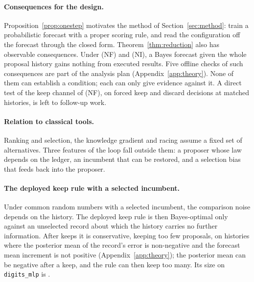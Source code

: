 \paragraph{Consequences for the design.}
Proposition~\ref{prop:onestep} motivates the method of Section~\ref{sec:method}: train a probabilistic forecast with a proper scoring rule, and read the configuration off the forecast through the closed form. Theorem~\ref{thm:reduction} also has observable consequences. Under (NF) and (NI), a Bayes forecast given the whole proposal history gains nothing from executed results. Five offline checks of such consequences are part of the analysis plan (Appendix~\ref{app:theory}). None of them can establish a condition; each can only give evidence against it. A direct test of the keep channel of (NF), on forced keep and discard decisions at matched histories, is left to follow-up work.

\paragraph{Relation to classical tools.}
Ranking and selection, the knowledge gradient \citep{frazier2008knowledge,chick2012sequential} and racing \citep{birattari2002frace} assume a fixed set of alternatives. Three features of the loop fall outside them: a proposer whose law depends on the ledger, an incumbent that can be restored, and a selection bias that feeds back into the proposer.

\paragraph{The deployed keep rule with a selected incumbent.}
Under common random numbers with a selected incumbent, the comparison noise depends on the history. The deployed keep rule is then Bayes-optimal only against an unselected record about which the history carries no further information. After keeps it is conservative, keeping too few proposals, on histories where the posterior mean of the record's error is non-negative and the forecast mean increment is not positive (Appendix~\ref{app:theory}); the posterior mean can be negative after a keep, and the rule can then keep too many. Its size on \texttt{digits\_mlp} is \CRNThresholdShiftDigits. 
